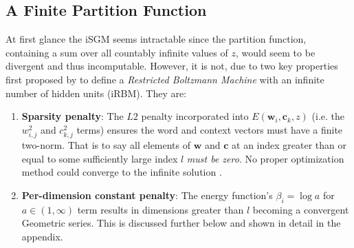 \documentclass{article} %
\begin{document}
\subsection{A Finite Partition Function}
At first glance the iSGM seems intractable since the partition function, containing a sum over all countably infinite values of $z$, would seem to be divergent and thus incomputable.  However, it is not, due to two key properties first proposed by \cite{cote2015infinite} to define a \textit{Restricted Boltzmann Machine} with an infinite number of hidden units (iRBM).  They are: \begin{enumerate}
  \item \textbf{Sparsity penalty}: The $L2$ penalty incorporated into $E(\mathbf{w}_{i}, \mathbf{c}_{k}, z)$ (i.e. the $w_{i,j}^{2}$ and $c_{k,j}^{2}$ terms) ensures the word and context vectors must have a finite two-norm.  That is to say all elements of $\mathbf{w}$ and $\mathbf{c}$ at an index greater than or equal to some sufficiently large index $l$ \emph{must be zero}.  No proper optimization method could converge to the infinite solution \citep{cote2015infinite}.   
  \item \textbf{Per-dimension constant penalty}:  The energy function's $\beta_{i} = \log a$ for $a \in (1, \infty)$ term results in dimensions greater than $l$ becoming a convergent Geometric series.  This is discussed further below and shown in detail in the appendix.  
\end{enumerate}
\end{document}
